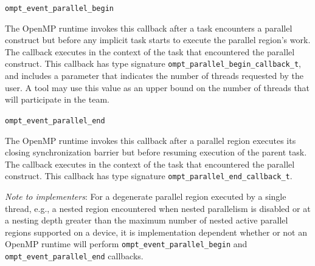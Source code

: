 \documentclass{article}
\newcommand{\descheader}[1]{{\needspace{3\baselineskip}\vspace{1em}\noindent \fbox{#1}}}
\begin{document}
\begin{description}

\item \verb|ompt_event_parallel_begin|

\sloppy
The OpenMP runtime invokes this callback 
after a task encounters a parallel construct
but before any implicit task starts to execute the
parallel region's work. The callback executes in the context of the task that encountered the parallel construct.
This callback has type signature \verb|ompt_parallel_begin_callback_t|, and includes a parameter that indicates the number of threads requested by the user. 
A tool may use this value as an upper bound on the number of threads that will participate in the team.



\item \verb|ompt_event_parallel_end|

The OpenMP runtime invokes this callback 
after a parallel
region executes its closing synchronization barrier but before
resuming execution of the parent task.  The callback executes in
the context of the task that encountered the parallel construct.
This callback has type signature \verb|ompt_parallel_end_callback_t|. 

\end{description}

\noindent
{\em Note to implementers}: For a degenerate parallel region executed by a single thread, e.g.,
a nested region encountered when nested parallelism is disabled or at a nesting depth greater than the 
maximum number of nested active parallel regions supported on a device, 
it is implementation dependent whether or not an OpenMP runtime will perform
 \verb|ompt_event_parallel_begin| and \verb|ompt_event_parallel_end| callbacks.

\descheader{Tasks}
\end{document}
